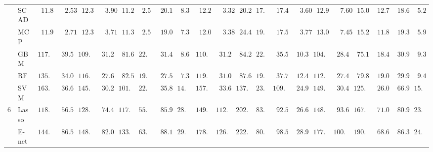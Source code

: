 \begin{tabular}{llllllllllllllllllllll}
	& SCAD  & $\phantom{0}11.81$ & $\phantom{00}2.53$ & $\phantom{0}12.32$ & $\phantom{00}3.90$ & $\phantom{0}11.26$ & $\phantom{0}2.58$ & $\phantom{0}20.18$ & $\phantom{0}8.37$ & $\phantom{0}12.23$ & $\phantom{00}3.32$ & $\phantom{0}20.29$ & $17.06$ & $\phantom{0}17.45$ & $\phantom{00}3.60$ & $\phantom{0}12.99$ & $\phantom{00}7.60$ & $\phantom{0}15.06$ & $\phantom{0}12.71$ & $\phantom{0}18.63$ & $\phantom{0}5.29$ \\
	& MCP  & $\phantom{0}11.99$ & $\phantom{00}2.71$ & $\phantom{0}12.38$ & $\phantom{00}3.71$ & $\phantom{0}11.33$ & $\phantom{0}2.54$ & $\phantom{0}19.00$ & $\phantom{0}7.35$ & $\phantom{0}12.07$ & $\phantom{00}3.38$ & $\phantom{0}24.41$ & $19.61$ & $\phantom{0}17.54$ & $\phantom{00}3.77$ & $\phantom{0}13.03$ & $\phantom{00}7.45$ & $\phantom{0}15.20$ & $\phantom{0}11.86$ & $\phantom{0}19.35$ & $\phantom{0}5.96$ \\
	& GBM  & $117.20$ & $\phantom{0}39.53$ & $109.72$ & $\phantom{0}31.28$ & $\phantom{0}81.61$ & $22.71$ & $\phantom{0}31.49$ & $\phantom{0}8.64$ & $110.46$ & $\phantom{0}31.26$ & $\phantom{0}84.20$ & $22.66$ & $\phantom{0}35.56$ & $\phantom{0}10.33$ & $104.68$ & $\phantom{0}28.43$ & $\phantom{0}75.11$ & $\phantom{0}18.49$ & $\phantom{0}30.93$ & $\phantom{0}9.38$ \\
	& RF  & $135.18$ & $\phantom{0}34.03$ & $116.37$ & $\phantom{0}27.61$ & $\phantom{0}82.55$ & $19.63$ & $\phantom{0}27.53$ & $\phantom{0}7.30$ & $119.28$ & $\phantom{0}31.01$ & $\phantom{0}87.64$ & $19.98$ & $\phantom{0}37.79$ & $\phantom{0}12.42$ & $112.50$ & $\phantom{0}27.47$ & $\phantom{0}79.84$ & $\phantom{0}19.08$ & $\phantom{0}29.90$ & $\phantom{0}9.42$ \\
	& SVM  & $163.73$ & $\phantom{0}36.63$ & $145.13$ & $\phantom{0}30.24$ & $101.39$ & $22.45$ & $\phantom{0}35.85$ & $14.32$ & $157.70$ & $\phantom{0}33.62$ & $137.34$ & $23.79$ & $109.13$ & $\phantom{0}24.94$ & $149.19$ & $\phantom{0}30.47$ & $125.37$ & $\phantom{0}26.07$ & $\phantom{0}66.95$ & $15.98$ \\
	6 & Lasso  & $118.35$ & $\phantom{0}56.56$ & $128.51$ & $\phantom{0}74.46$ & $117.09$ & $55.54$ & $\phantom{0}85.93$ & $28.47$ & $149.85$ & $112.89$ & $202.37$ & $83.04$ & $\phantom{0}92.50$ & $\phantom{0}26.63$ & $148.40$ & $\phantom{0}93.64$ & $167.81$ & $\phantom{0}71.09$ & $\phantom{0}80.90$ & $23.12$ \\
	& E-net  & $144.43$ & $\phantom{0}86.54$ & $148.87$ & $\phantom{0}82.01$ & $133.02$ & $63.52$ & $\phantom{0}88.15$ & $29.61$ & $178.74$ & $126.56$ & $222.45$ & $80.86$ & $\phantom{0}98.59$ & $\phantom{0}28.97$ & $177.28$ & $100.85$ & $190.29$ & $\phantom{0}68.67$ & $\phantom{0}86.33$ & $24.92$ \\

\end{tabular}
